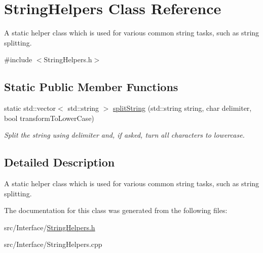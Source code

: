\hypertarget{classStringHelpers}{}\section{String\+Helpers Class Reference}
\label{classStringHelpers}


A static helper class which is used for various common string tasks, such as string splitting.  




{\ttfamily \#include $<$String\+Helpers.\+h$>$}

\subsection*{Static Public Member Functions}
\begin{DoxyCompactItemize}
\item 
\mbox{\label{classStringHelpers_a8eb2538c57375d065783268f7985d676}} 
static std\+::vector$<$ std\+::string $>$ \hyperlink{classStringHelpers_a8eb2538c57375d065783268f7985d676}{split\+String} (std\+::string string, char delimiter, bool transform\+To\+Lower\+Case)
\begin{DoxyCompactList}\small\item\em Split the string using delimiter and, if asked, turn all characters to lowercase. \end{DoxyCompactList}\end{DoxyCompactItemize}


\subsection{Detailed Description}
A static helper class which is used for various common string tasks, such as string splitting. 

The documentation for this class was generated from the following files\+:\begin{DoxyCompactItemize}
\item 
src/\+Interface/\hyperlink{StringHelpers_8h}{String\+Helpers.\+h}\item 
src/\+Interface/String\+Helpers.\+cpp\end{DoxyCompactItemize}
